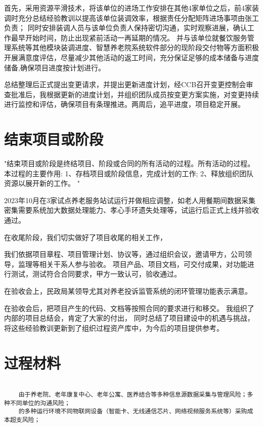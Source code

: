 \documentclass[UTF8]{../computerUniverse}
\begin{document}
首先，采用资源平滑技术，将该单位的进场工作安排在其他4家单位之后，前4家装调时充分总结经验教训以提高该单位装调效率，根据责任分配矩阵进场事项由张工负责；
同时安排装调人员与该单位负责人保持密切沟通，实时观察进展，确认工作最早开始时间，防止出现紧前活动一再延期的情况。
并与该单位就餐饮服务管理系统等其他模块装调进度、智慧养老院系统软件部分的现阶段交付物等方面积极开展满意度评估，尽量减少其他活动的返工时间，充分保证足够的成本储备与进度储备,确保项目进度按计划进行。

总结整理后正式提出变更请求，并提出更新进度计划，经CCB召开变更控制会审查批准后，我根据更新的进度计划，并组织团队成员按变更方案实施，对变更持续进行监控和评估，确保项目有条理推进。两周后，追平进度，项目稳定开展。

\section{结束项目或阶段}

"结束项目或阶段是终结项目、阶段或合同的所有活动的过程。所有活动的过程。本过程的主要作用:
1、存档项目或阶段信息，完成计划的工作;
2、释放组织团队资源以展开新的工作。
"

2023年10月在3家试点养老服务站试运行并做相应调整，如老人用餐期间数据采集密集需要系统加大数据处理能力、孝心手环遗失处理等，试运行后正式上线并验收通过。

在收尾阶段，我们切实做好了项目收尾的相关工作，

我们依据项目章程、项目管理计划、协议等，通过组织会议，邀请甲方，公司领导，监理等相关干系人参与验收。
项目产品、项目文档，可交付成果，对功能进行测试，测试符合合同要求，甲方一致认可，验收通过。

在验收会上，民政局某领导尤其对养老投诉监管系统的闭环管理功能表示满意。

在验收会后，把项目产生的代码、文档等按照合同的要求进行和移交。
我组织了内部的项目总结会，肯定了大家的付出，
同时总结了项目建设中的机遇与挑战，将这些经验教训更新到了组织过程资产库中，为今后的项目提供参考。



\section{过程材料}
\begin{lstlisting}

    由于养老院、老年康复中心、老年公寓、医养结合等多种信息源数据采集与管理风险；多种不同单位的沟通风险；
    的多种运行环境不同物联网设备（智能卡、无线通信芯片、网络视频服务系统等）采购成本超支风险；
\end{lstlisting}
\end{document}
